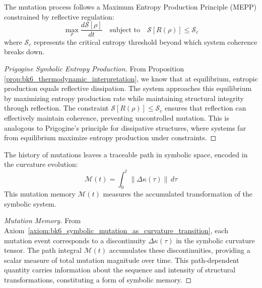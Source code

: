 \begin{proposition}
\label{prop:bk6_thermodynamic_interpretation}
The mutation process follows a Maximum Entropy Production Principle (MEPP) constrained by reflective regulation:
\begin{equation}
\max_{\rho} \frac{d\mathcal{S}[\rho]}{dt} \quad \text{subject to} \quad \mathcal{S}[R(\rho)] \leq \mathcal{S}_c
\end{equation}
where $\mathcal{S}_c$ represents the critical entropy threshold beyond which system coherence breaks down.
\begin{proof}[Prigogine Symbolic Entropy Production]
\label{proof:bk6_prigogine_symbolic_entropy_production}
From Proposition \ref{prop:bk6_thermodynamic_interpretation}, we know that at equilibrium, entropic production equals reflective dissipation. The system approaches this equilibrium by maximizing entropy production rate while maintaining structural integrity through reflection. The constraint $\mathcal{S}[R(\rho)] \leq \mathcal{S}_c$ ensures that reflection can effectively maintain coherence, preventing uncontrolled mutation. This is analogous to Prigogine's principle for dissipative structures, where systems far from equilibrium maximize entropy production under constraints.
\end{proof}
\end{proposition}
\begin{corollary}
\label{corollary:bk6_mutation_memory}
The history of mutations leaves a traceable path in symbolic space, encoded in the curvature evolution:
\begin{equation}
\mathcal{M}(t) = \int_0^t \|\Delta\kappa(\tau)\| \, d\tau
\end{equation}
This mutation memory $\mathcal{M}(t)$ measures the accumulated transformation of the symbolic system.
\begin{proof}[Mutation Memory]
\label{proof:bk6_mutation_memory}
From Axiom~\ref{axiom:bk6_symbolic_mutation_as_curvature_transition}, each mutation event corresponds to a discontinuity $\Delta\kappa(\tau)$ in the symbolic curvature tensor. The path integral $\mathcal{M}(t)$ accumulates these discontinuities, providing a scalar measure of total mutation magnitude over time. This path-dependent quantity carries information about the sequence and intensity of structural transformations, constituting a form of symbolic memory.
\end{proof}
\end{corollary}
